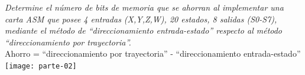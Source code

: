 \documentclass[12pt]{article}
\begin{document}
\textit{Determine el número de bits de memoria que se ahorran al
implementar una carta ASM que posee 4 entradas (X,Y,Z,W), 20
estados, 8 salidas (S0-S7), mediante el método de ``direccionamiento
entrada-estado'' respecto al método ``direccionamiento por trayectoria''.}\\

Ahorro = ``direccionamiento por trayectoria'' - ``direccionamiento
entrada-estado''\\ 


\texttt{[image: parte-02]}
\end{document}
